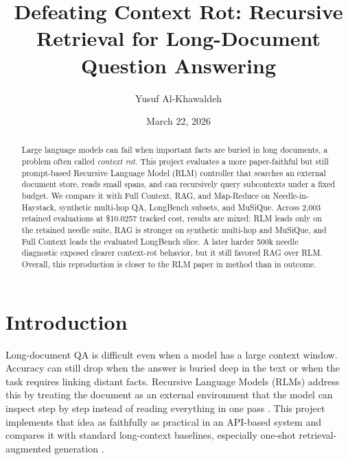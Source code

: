 \documentclass[11pt]{article}
\title{Defeating Context Rot: Recursive Retrieval for Long-Document Question Answering}
\author{Yusuf Al-Khawaldeh}
\date{March 22, 2026}
\begin{document}
\maketitle

\begin{abstract}
Large language models can fail when important facts are buried in long documents, a problem often called \emph{context rot}. This project evaluates a more paper-faithful but still prompt-based Recursive Language Model (RLM) controller that searches an external document store, reads small spans, and can recursively query subcontexts under a fixed budget. We compare it with Full Context, RAG, and Map-Reduce on Needle-in-Haystack, synthetic multi-hop QA, LongBench subsets, and MuSiQue. Across 2,003 retained evaluations at \$10.0257 tracked cost, results are mixed: RLM leads only on the retained needle suite, RAG is stronger on synthetic multi-hop and MuSiQue, and Full Context leads the evaluated LongBench slice. A later harder 500k needle diagnostic exposed clearer context-rot behavior, but it still favored RAG over RLM. Overall, this reproduction is closer to the RLM paper in method than in outcome.
\end{abstract}

\section{Introduction}
Long-document QA is difficult even when a model has a large context window. Accuracy can still drop when the answer is buried deep in the text or when the task requires linking distant facts. Recursive Language Models (RLMs) address this by treating the document as an external environment that the model can inspect step by step instead of reading everything in one pass \cite{liu2024lost, zhang2025rlm}. This project implements that idea as faithfully as practical in an API-based system and compares it with standard long-context baselines, especially one-shot retrieval-augmented generation \cite{lewis2020rag}.
\end{document}

